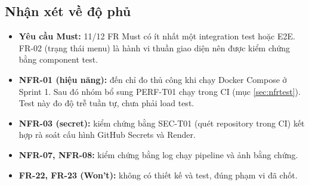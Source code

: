 \subsection{Nhận xét về độ phủ}
\begin{itemize}
\item \textbf{Yêu cầu Must:} 11/12 FR Must có ít nhất một integration test hoặc E2E. FR-02 (trạng thái menu) là hành vi thuần giao diện nên được kiểm chứng bằng component test.
\item \textbf{NFR-01 (hiệu năng):} đến  chỉ đo thủ công khi chạy Docker Compose ở Sprint 1. Sau đó nhóm bổ sung PERF-T01 chạy trong CI (mục \ref{sec:nfrtest}). Test này đo độ trễ tuần tự, chưa phải load test.
\item \textbf{NFR-03 (secret):} kiểm chứng bằng SEC-T01 (quét repository trong CI) kết hợp rà soát cấu hình GitHub Secrets và Render.
\item \textbf{NFR-07, NFR-08:} kiểm chứng bằng log chạy pipeline và ảnh bằng chứng.
\item \textbf{FR-22, FR-23 (Won't):} không có thiết kế và test, đúng phạm vi đã chốt.
\end{itemize}
